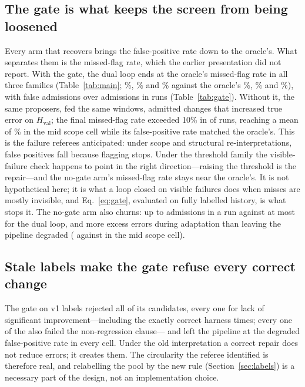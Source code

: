 \documentclass[11pt]{article}
\newcommand{\Hval}{H_{\mathrm{val}}}
\begin{document}
\subsection{The gate is what keeps the screen from being loosened}

Every arm that recovers brings the false-positive rate down to the oracle's. What separates them is the missed-flag rate, which the earlier presentation did not report. With the gate, the dual loop ends at the oracle's missed-flag rate in all three families (Table~\ref{tab:main}; \missthrdual\%, \missscopedual\% and \missstructdual\% against the oracle's \missthroracle\%, \missscopeoracle\% and \missstructoracle\%), with \gfadual{} false admissions over \gadmdual{} admissions in \ncells{} runs (Table~\ref{tab:gate}). Without it, the same proposers, fed the same windows, admitted \gfanogate{} changes that increased true error on $\Hval$; the final missed-flag rate exceeded 10\% in \gmtennogate{} of \ncells{} runs, reaching a mean of \missscopenogate\% in the mid scope cell while its false-positive rate matched the oracle's. This is the failure referees anticipated: under scope and structural re-interpretations, false positives fall because flagging stops. Under the threshold family the visible-failure check happens to point in the right direction---raising the threshold is the repair---and the no-gate arm's missed-flag rate stays near the oracle's. It is not hypothetical here; it is what a loop closed on visible failures does when misses are mostly invisible, and Eq.~\eqref{eq:gate}, evaluated on fully labelled history, is what stops it. The no-gate arm also churns: up to \gmaxadmnogate{} admissions in a run against at most \gmaxadmdual{} for the dual loop, and more excess errors during adaptation than leaving the pipeline degraded (\exscopenogate{} against \exscopedegraded{} in the mid scope cell).

\subsection{Stale labels make the gate refuse every correct change}
\label{sec:stale}

The gate on v1 labels rejected all \gpropstalegate{} of its candidates, every one for lack of significant improvement---including the exactly correct harness \gorjstalegate{} times; every one of the \staleBothFail{} also failed the non-regression clause--- and left the pipeline at the degraded false-positive rate in every cell. Under the old interpretation a correct repair does not reduce errors; it creates them. The circularity the referee identified is therefore real, and relabelling the pool by the new rule (Section~\ref{sec:labels}) is a necessary part of the design, not an implementation choice.
\end{document}
